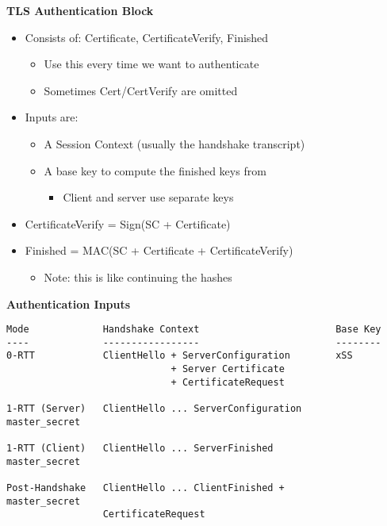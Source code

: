 \documentclass[helvetica]{seminar}
\newcommand{\heading}[1]{%
  \begin{center} 
    \large\bf 
    #1 
  \end{center} 
  \vspace{.4 in}}
\begin{document}
\begin{slide}
\heading{TLS Authentication Block}

\begin{itemize}
\item Consists of: Certificate, CertificateVerify, Finished
  \begin{itemize}
  \item Use this every time we want to authenticate
  \item Sometimes Cert/CertVerify are omitted
  \end{itemize}

\item Inputs are:
  \begin{itemize}
  \item A Session Context (usually the handshake transcript)
  \item A base key to compute the finished keys from
    \begin{itemize}
    \item Client and server use separate keys
    \end{itemize}
  \end{itemize}

\item CertificateVerify = Sign(SC + Certificate)
\item Finished = MAC(SC + Certificate + CertificateVerify)
  \begin{itemize}
  \item Note: this is like continuing the hashes
  \end{itemize}
\end{itemize}
\end{slide}


\begin{slide}
\heading{Authentication Inputs}

\vspace{-3ex}
\begin{footnotesize}
\begin{verbatim}
Mode             Handshake Context                        Base Key
----             -----------------                        --------
0-RTT            ClientHello + ServerConfiguration        xSS
                             + Server Certificate
                             + CertificateRequest
                            
1-RTT (Server)   ClientHello ... ServerConfiguration      master_secret
                 
1-RTT (Client)   ClientHello ... ServerFinished           master_secret

Post-Handshake   ClientHello ... ClientFinished +         master_secret
                 CertificateRequest
\end{verbatim}
\end{footnotesize}
\end{slide}
\end{document}
